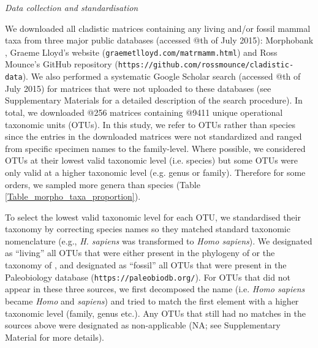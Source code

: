 \documentclass[12pt,letterpaper]{article}
\renewcommand{\subsection}[1]{%
\bigskip
\begin{center}
\begin{large}
\normalfont\itshape #1
\end{large}
\end{center}}
\begin{document}
\subsection{Data collection and standardisation}
We downloaded all cladistic matrices containing any living and/or fossil mammal taxa from three major public databases (accessed @th of July 2015): Morphobank \citep[\texttt{http://www.morphobank.org/};][]{morphobank}, Graeme Lloyd's website (\texttt{graemetlloyd.com/matrmamm.html}) and Ross Mounce's GitHub repository (\texttt{https://github.com/rossmounce/cladistic-data}).
We also performed a systematic Google Scholar search (accessed @th of July 2015) for matrices that were not uploaded to these databases (see Supplementary Materials for a detailed description of the search procedure).
In total, we downloaded @256 %
matrices containing @9411 unique %
operational taxonomic units (OTUs).
In this study, we refer to OTUs rather than species since the entries in the downloaded matrices were not standardized and ranged from specific specimen names %
to the family-level.
Where possible, we considered OTUs at their lowest valid taxonomic level (i.e. species) but some OTUs were only valid at a higher taxonomic level (e.g. genus or family).
Therefore for some orders, we sampled more genera than species (Table \ref{Table_morpho_taxa_proportion}).

To select the lowest valid taxonomic level for each OTU, we standardised their taxonomy by correcting species names so they matched standard taxonomic nomenclature (e.g., \textit{H. sapiens} was transformed to \textit{Homo sapiens}).
We designated as ``living'' all OTUs that were either present in the phylogeny of \citet{FritzTree} or the taxonomy of \citet{wilson2005mammal}, and designated as ``fossil'' all OTUs that were present in the Paleobiology database (\texttt{https://paleobiodb.org/}).
For OTUs that did not appear in these three sources, we first decomposed the name (i.e. \textit{Homo sapiens} became \textit{Homo} and \textit{sapiens}) and tried to match the first element with a higher taxonomic level (family, genus etc.).
Any OTUs that still had no matches in the sources above were designated as non-applicable (NA; see Supplementary Material for more details).
\end{document}
